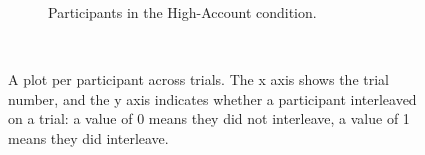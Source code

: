 \begin{figure}[!htbp]
\begin{subfigure}[b]{0.5\textwidth}
        \caption{Participants in the High-Account condition.}
    \end{subfigure}
    ~ %
    \caption{A plot per participant across trials. The x axis shows the trial number, and the y axis indicates whether a participant interleaved on a trial: a value of 0 means they did not interleave, a value of 1 means they did interleave.}\label{fig:ch34_4-plotpp}
\end{figure}